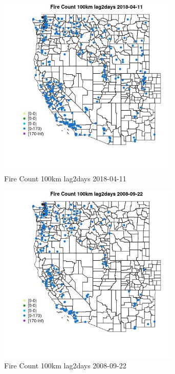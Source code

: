 \begin{figure} 
\centering  
\includegraphics[width=0.77\textwidth]{Code_Outputs/Report_ML_input_PM25_Step4_part_e_de_duplicated_aves_compiled_2019-05-18wNAs_MapObsFire_Count_100km_lag2days2018-04-11.jpg} 
\caption{\label{fig:Report_ML_input_PM25_Step4_part_e_de_duplicated_aves_compiled_2019-05-18wNAsMapObsFire_Count_100km_lag2days2018-04-11}Fire Count 100km lag2days 2018-04-11} 
\end{figure} 
 

\begin{figure} 
\centering  
\includegraphics[width=0.77\textwidth]{Code_Outputs/Report_ML_input_PM25_Step4_part_e_de_duplicated_aves_compiled_2019-05-18wNAs_MapObsFire_Count_100km_lag2days2008-09-22.jpg} 
\caption{\label{fig:Report_ML_input_PM25_Step4_part_e_de_duplicated_aves_compiled_2019-05-18wNAsMapObsFire_Count_100km_lag2days2008-09-22}Fire Count 100km lag2days 2008-09-22} 
\end{figure} 
 

